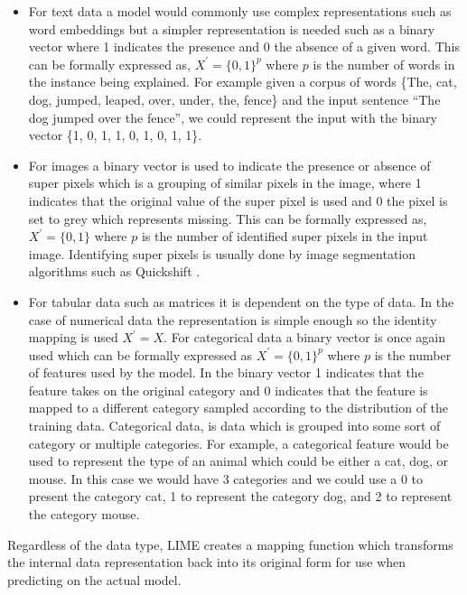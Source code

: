 \begin{itemize}
\item For text data a model would commonly use complex representations such as word embeddings but a simpler representation is needed such as a binary vector where 1 indicates the presence and 0 the absence of a given word. This can be formally expressed as, 
$X^{'}={\{0,1\}}^{p}$ where $p$ is the number of words in the instance being explained. For example given a corpus of words \{The, cat, dog, jumped, leaped, over, under, the, fence\} and the input sentence  ``The dog jumped over the fence'', we could represent the input with the binary vector \{1, 0, 1, 1, 0, 1, 0, 1, 1\}.

\item For images a binary vector is used to indicate the presence or absence of super pixels \cite{10.5555/946247.946677} which is a grouping of similar pixels in the image, where 1 indicates that the original value of the super pixel is used and 0 the pixel is set to grey which represents missing. This can be formally expressed as, $X^{'} = {\{0,1\}}$ where $p$ is the number of identified super pixels in the input image. Identifying super pixels is usually done by image segmentation algorithms such as Quickshift \cite{10.1007/978-3-540-88693-8_52}.

\item For tabular data such as matrices it is dependent on the type of data. In the case of numerical data the representation is simple enough so the identity mapping is used $X^{'} = X$. For categorical data a binary vector is once again used which can be formally expressed as $X^{'}={\{0,1\}^{p}}$ where $p$ is the number of features used by the model. In the binary vector 1 indicates that the feature takes on the original category and 0 indicates that the feature is mapped to a different category sampled according to the distribution of the training data. Categorical data, is data which is grouped into some sort of category or multiple categories. For example, a categorical feature would be used to represent the type of an animal which could be either a cat, dog, or mouse. In this case we would have 3 categories and we could use a 0 to present the category cat, 1 to represent the category dog, and 2 to represent the category mouse.
\end{itemize}
Regardless of the data type, LIME creates a mapping function which transforms the internal data representation back into its original form for use when predicting on the actual model.

